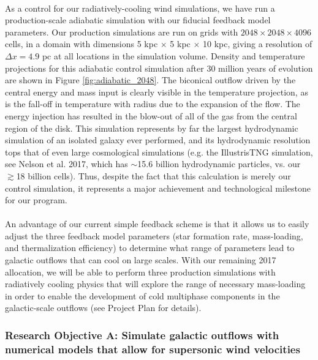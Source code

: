 \documentclass[11pt,letterpaper,english]{article}
\begin{document}
~\\
As a control for our radiatively-cooling wind simulations, we have run a production-scale adiabatic simulation with our fiducial feedback model parameters. Our production simulations are run on grids with $2048\times2048\times4096$ cells, in a domain with dimensions 5 kpc $\times$ 5 kpc $\times$ 10 kpc, giving a resolution of $\Delta x=4.9$ pc at all locations in the simulation volume. Density and temperature projections for this adiabatic control simulation after 30 million years of evolution are shown in Figure \ref{fig:adiabatic_2048}. The biconical outflow driven by the central energy and mass input is clearly visible in the temperature projection, as is the fall-off in temperature with radius due to the expansion of the flow. The energy injection has resulted in the blow-out of all of the gas from the central region of the disk. This simulation represents by far the largest hydrodynamic simulation of an isolated galaxy ever performed, and its hydrodynamic resolution tops that of even large cosmological simulations (e.g. the IllustrisTNG simulation, see Nelson et al. 2017, which has $\sim$15.6 billion hydrodynamic particles, vs. our $\gtrsim$18 billion cells). Thus, despite the fact that this calculation is merely our control simulation, it represents a major achievement and technological milestone for our program.
~\\~\\
An advantage of our current simple feedback scheme is that it allows us to easily adjust the three feedback model parameters (star formation rate, mass-loading, and thermalization efficiency) to determine what range of parameters lead to galactic outflows that can cool on large scales. With our remaining 2017 allocation, we will be able to perform three production simulations with radiatively cooling physics that will explore the range of necessary mass-loading in order to enable the development of cold multiphase components in the
galactic-scale outflows (see Project Plan for details).

\subsubsection{Research Objective A: Simulate galactic outflows with numerical models that allow for supersonic wind velocities}
\end{document}
